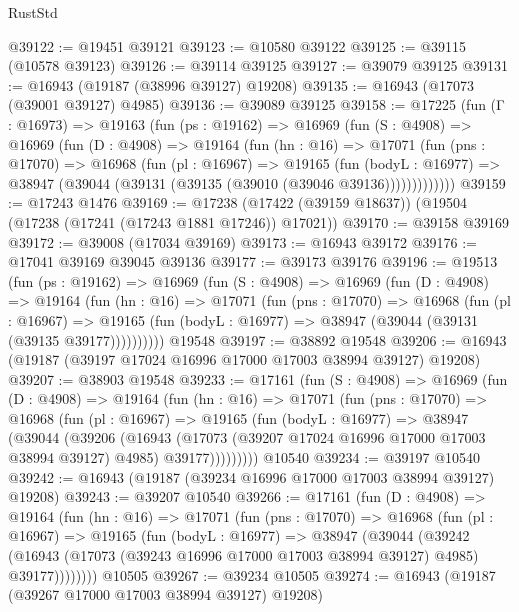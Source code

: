 \begin{lexlean}{RustStd}
\begin{coremodule}
@39122 := @19451 @39121
@39123 := @10580 @39122
@39125 := @39115 (@10578 @39123)
@39126 := @39114 @39125
@39127 := @39079 @39125
@39131 := @16943 (@19187 (@38996 @39127) @19208)
@39135 := @16943 (@17073 (@39001 @39127) @4985)
@39136 := @39089 @39125
@39158 := @17225
    (fun (Γ : @16973) =>
    @19163
      (fun (ps : @19162) =>
      @16969
        (fun (S : @4908) =>
        @16969
          (fun (D : @4908) =>
          @19164
            (fun (hn : @16) =>
            @17071
              (fun (pns : @17070) =>
              @16968
                (fun (pl : @16967) =>
                @19165
                  (fun (bodyL : @16977) =>
                  @38947 (@39044 (@39131 (@39135 (@39010 (@39046 @39136)))))))))))))
@39159 := @17243 @1476
@39169 := @17238 (@17422 (@39159 @18637)) (@19504 (@17238 (@17241 (@17243 @1881 @17246)) @17021))
@39170 := @39158 @39169
@39172 := @39008 (@17034 @39169)
@39173 := @16943 @39172
@39176 := @17041 @39169 @39045 @39136
@39177 := @39173 @39176
@39196 := @19513
    (fun (ps : @19162) =>
    @16969
      (fun (S : @4908) =>
      @16969
        (fun (D : @4908) =>
        @19164
          (fun (hn : @16) =>
          @17071
            (fun (pns : @17070) =>
            @16968
              (fun (pl : @16967) =>
              @19165 (fun (bodyL : @16977) => @38947 (@39044 (@39131 (@39135 @39177))))))))))
    @19548
@39197 := @38892 @19548
@39206 := @16943 (@19187 (@39197 @17024 @16996 @17000 @17003 @38994 @39127) @19208)
@39207 := @38903 @19548
@39233 := @17161
    (fun (S : @4908) =>
    @16969
      (fun (D : @4908) =>
      @19164
        (fun (hn : @16) =>
        @17071
          (fun (pns : @17070) =>
          @16968
            (fun (pl : @16967) =>
            @19165
              (fun (bodyL : @16977) =>
              @38947
                (@39044
                  (@39206
                    (@16943
                      (@17073 (@39207 @17024 @16996 @17000 @17003 @38994 @39127) @4985)
                      @39177)))))))))
    @10540
@39234 := @39197 @10540
@39242 := @16943 (@19187 (@39234 @16996 @17000 @17003 @38994 @39127) @19208)
@39243 := @39207 @10540
@39266 := @17161
    (fun (D : @4908) =>
    @19164
      (fun (hn : @16) =>
      @17071
        (fun (pns : @17070) =>
        @16968
          (fun (pl : @16967) =>
          @19165
            (fun (bodyL : @16977) =>
            @38947
              (@39044
                (@39242
                  (@16943 (@17073 (@39243 @16996 @17000 @17003 @38994 @39127) @4985) @39177))))))))
    @10505
@39267 := @39234 @10505
@39274 := @16943 (@19187 (@39267 @17000 @17003 @38994 @39127) @19208)

\end{coremodule}
\end{lexlean}
